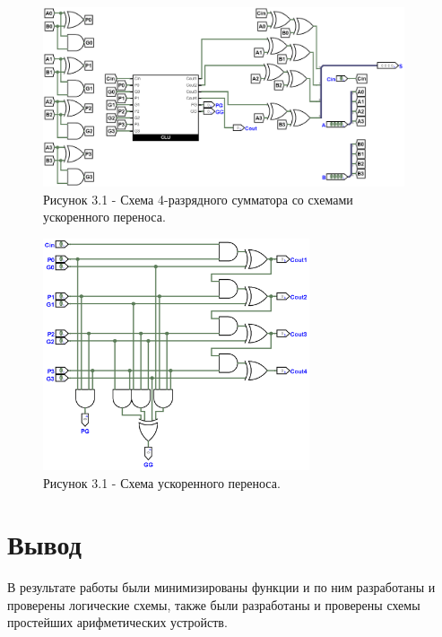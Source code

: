 \documentclass[oneside,a4paper,14pt]{extarticle}
\begin{document}
\begin{figure}[h!]
	\centering
	\includegraphics[width=0.95\textwidth]{pics/4_4.png}
	\caption*{Рисунок 3.1 - Схема 4-разрядного сумматора со схемами ускоренного переноса.}
\end{figure}

\begin{figure}[h!]
	\centering
	\includegraphics[width=0.7\textwidth]{pics/4_CLU.png}
	\caption*{Рисунок 3.1 - Схема ускоренного переноса.}
\end{figure}


\newpage
\section*{Вывод}
В результате работы были минимизированы функции и по ним разработаны и проверены
логические схемы, также были разработаны и проверены схемы простейших арифметических устройств.\\
\end{document}
